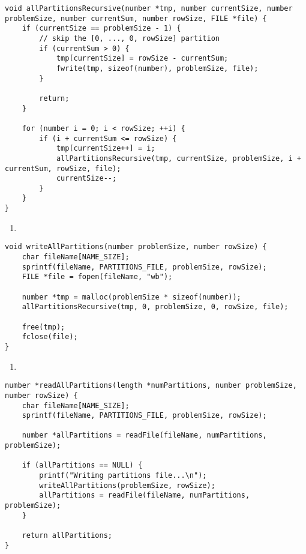 \begin{lstlisting}[caption={},label={allPartitionsRecursive}]
void allPartitionsRecursive(number *tmp, number currentSize, number problemSize, number currentSum, number rowSize, FILE *file) {
    if (currentSize == problemSize - 1) {
        // skip the [0, ..., 0, rowSize] partition
        if (currentSum > 0) {
            tmp[currentSize] = rowSize - currentSum;
            fwrite(tmp, sizeof(number), problemSize, file);
        }

        return;
    }

    for (number i = 0; i < rowSize; ++i) {
        if (i + currentSum <= rowSize) {
            tmp[currentSize++] = i;
            allPartitionsRecursive(tmp, currentSize, problemSize, i + currentSum, rowSize, file);
            currentSize--;
        }
    }
}
\end{lstlisting}

\begin{enumerate}
\addtocounter{enumi}{1}
\item 
\end{enumerate}

\begin{lstlisting}[caption={},label={writeAllPartitions}]
void writeAllPartitions(number problemSize, number rowSize) {
    char fileName[NAME_SIZE];
    sprintf(fileName, PARTITIONS_FILE, problemSize, rowSize);
    FILE *file = fopen(fileName, "wb");

    number *tmp = malloc(problemSize * sizeof(number));
    allPartitionsRecursive(tmp, 0, problemSize, 0, rowSize, file);

    free(tmp);
    fclose(file);
}
\end{lstlisting}

\begin{enumerate}
\addtocounter{enumi}{1}
\item 
\end{enumerate}

\begin{lstlisting}[caption={},label={readAllPartitions}]
number *readAllPartitions(length *numPartitions, number problemSize, number rowSize) {
    char fileName[NAME_SIZE];
    sprintf(fileName, PARTITIONS_FILE, problemSize, rowSize);

    number *allPartitions = readFile(fileName, numPartitions, problemSize);

    if (allPartitions == NULL) {
        printf("Writing partitions file...\n");
        writeAllPartitions(problemSize, rowSize);
        allPartitions = readFile(fileName, numPartitions, problemSize);
    }

    return allPartitions;
}
\end{lstlisting}

